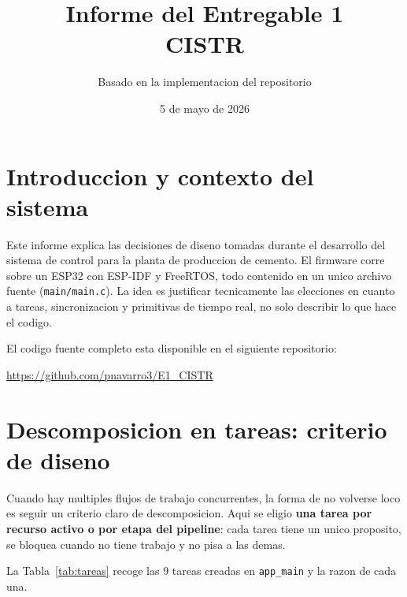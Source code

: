 \documentclass[12pt,a4paper]{article}
\title{Informe del Entregable 1\\CISTR}
\author{Basado en la implementacion del repositorio}
\date{5 de mayo de 2026}
\begin{document}
\maketitle
\tableofcontents
\newpage

\section{Introduccion y contexto del sistema}

Este informe explica las decisiones de diseno tomadas durante el desarrollo del sistema de control para la planta de produccion de cemento. El firmware corre sobre un ESP32 con ESP-IDF y FreeRTOS, todo contenido en un unico archivo fuente (\texttt{main/main.c}). La idea es justificar tecnicamente las elecciones en cuanto a tareas, sincronizacion y primitivas de tiempo real, no solo describir lo que hace el codigo.

El codigo fuente completo esta disponible en el siguiente repositorio:
\begin{center}
  \url{https://github.com/pnavarro3/E1_CISTR}
\end{center}

\section{Descomposicion en tareas: criterio de diseno}

Cuando hay multiples flujos de trabajo concurrentes, la forma de no volverse loco es seguir un criterio claro de descomposicion. Aqui se eligio \textbf{una tarea por recurso activo o por etapa del pipeline}: cada tarea tiene un unico proposito, se bloquea cuando no tiene trabajo y no pisa a las demas.

La Tabla~\ref{tab:tareas} recoge las 9 tareas creadas en \texttt{app\_main} y la razon de cada una.
\end{document}
